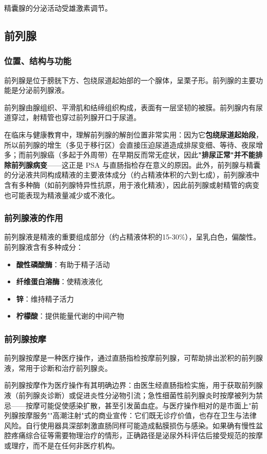 精囊腺的分泌活动受雄激素调节。

\subsection{前列腺}
\subsubsection{位置、结构与功能}

前列腺是位于膀胱下方、包绕尿道起始部的一个腺体，呈栗子形。前列腺的主要功能是分泌前列腺液。

前列腺由腺组织、平滑肌和结缔组织构成，表面有一层坚韧的被膜。前列腺内有尿道穿过，射精管也穿过前列腺开口于尿道。


在临床与健康教育中，理解前列腺的解剖位置非常实用：因为它\textbf{包绕尿道起始段}，所以前列腺的增生（多见于移行区）会直接压迫尿道造成排尿变细、等待、夜尿增多；而前列腺癌（多起于外周带）在早期反而常无症状，因此\textbf{"排尿正常"并不能排除前列腺病变}——这正是 PSA 与直肠指检存在意义的原因。此外，前列腺与精囊的分泌液共同构成精液的主要液体成分（约占精液体积的六到七成），前列腺液中含有多种酶（如前列腺特异性抗原，用于液化精液），因此前列腺或射精管的病变也可能表现为精液量减少或不液化。

\subsubsection{前列腺液的作用}

前列腺液是精液的重要组成部分（约占精液体积的15-30\%），呈乳白色，偏酸性。前列腺液含有多种成分：
\begin{itemize}
    \item \textbf{酸性磷酸酶}：有助于精子活动
    \item \textbf{纤维蛋白溶酶}：使精液液化
    \item \textbf{锌}：维持精子活力
    \item \textbf{柠檬酸}：提供能量代谢的中间产物
\end{itemize}

\subsubsection{前列腺按摩}

前列腺按摩是一种医疗操作，通过直肠指检按摩前列腺，可帮助排出淤积的前列腺液，常用于诊断和治疗前列腺炎。


前列腺按摩作为医疗操作有其明确边界：由医生经直肠指检实施，用于获取前列腺液（前列腺炎诊断）或促进炎性分泌物引流；急性细菌性前列腺炎时按摩被列为禁忌——按摩可能促使感染扩散，甚至引发菌血症。与医疗操作相对的是市面上"前列腺按摩服务""高潮注射"式的商业宣传：它们既无诊疗价值，也存在卫生与法律风险。自行使用器具深部刺激直肠同样可能造成黏膜损伤与感染。如果确有慢性盆腔疼痛综合征等需要物理治疗的情形，正确路径是泌尿外科评估后接受规范的按摩或理疗，而不是在任何非医疗机构。

